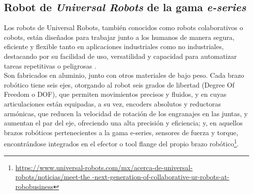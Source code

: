 \pagebreak
\subsection{Robot de \textit{Universal Robots} de la gama \textit{e-series}}
\label{subsec:URe-series}

Los robots de Universal Robots, también conocidos como robots colaborativos o cobots, están diseñados para trabajar junto a los humanos de manera segura, eficiente y flexible tanto en aplicaciones industriales como no industriales, destacando por su facilidad de uso, versatilidad y capacidad para automatizar tareas repetitivas o peligrosas \cite{UR_e-series_brochure18}. \\

Son fabricados en aluminio, junto con otros materiales de bajo peso. %
Cada brazo robótico tiene seis ejes, otorgando al robot seis grados de libertad (Degree Of Freedom o DOF), que permiten movimientos precisos y fluidos, y en cuyas articulaciones están equipadas, a su vez, encoders absolutos y reductoras armónicas, que reducen la velocidad de rotación de los engranajes en las juntas, y aumentan el par del eje, ofreciendo una alta precisión y eficiencia; y, en aquellos brazos robóticos pertenecientes a la gama e-series, sensores de fuerza y torque, encontrándose integrados en el efector o tool flange del propio brazo robótico\footnote{\url{https://www.universal-robots.com/mx/acerca-de-universal-robots/noticias/meet-the
-next-generation-of-collaborative-ur-robots-at-robobusiness}}.\\



